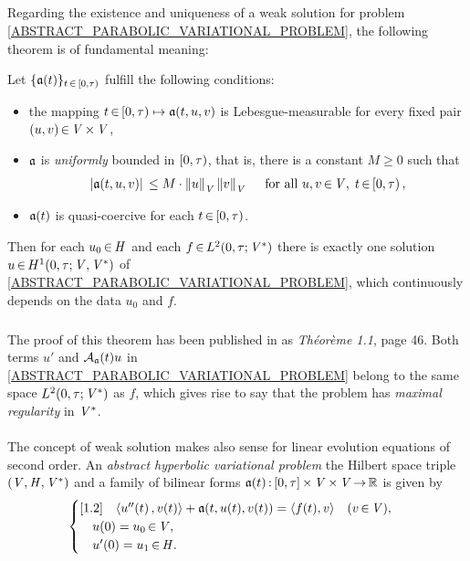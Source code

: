 \documentclass[11pt,twoside]{article}
\begin{document}
\subparagraph{} %
Regarding the existence and uniqueness of a {weak solution}
for problem \eqref{ABSTRACT_PARABOLIC_VARIATIONAL_PROBLEM},
the following theorem is of fundamental meaning:

\begin{theorem1}\label{LIONS_THEOREM_I}
Let $\{\mathfrak{a}(t)\}_{t {\,\in\,} [0,\tau)}$ fulfill the following conditions:

\begin{itemize}[leftmargin=9mm]
\item[(a)]
the mapping $t {\,\in\,} [0,\tau) \mapsto \mathfrak{a}(t,u,v)$ is Lebesgue-measurable
for every fixed pair $(u,v) {\,\in\,} \mathit{V} {\,\times\,} \mathit{V}$,

\item[(b)]
$\mathfrak{a}$ is \textit{uniformly} bounded in $[0,\tau)$,
that is,
there is a constant $M \geq 0$ such that
\[
\abs{\sql(t,u,v)} \, \leq M \cdot \norm{u}_{\vecV} \norm{v}_{\vecV}
\qfa u,v \xeof \vecV, \; t \xeof [0,\T)\,,
\]
\item[(c)]
$\mathfrak{a}(t)$ is quasi-coercive for each $t {\,\in\,} [0,\tau)$.
\end{itemize}

Then for each $u_0 {\,\in\,} \mathit{H}$ and each $f {\,\in\,} L^2(0,\tau;\mathit{V}^*)$
there is exactly one solution $u {\,\in\,} H^1(0,\tau;\mathit{V},\mathit{V}^*)$
of \eqref{ABSTRACT_PARABOLIC_VARIATIONAL_PROBLEM},
which continuously depends on the data $u_0$ and $f$.
\end{theorem1}

\subparagraph{}
The proof of this theorem has been published in \cite{Li2}
as \textit{Th\'{e}or\`{e}me 1.1}, page 46.
Both terms $u'$ and ${{\mathcal{A}}_{\mathfrak{a}}}(t) u$
in \eqref{ABSTRACT_PARABOLIC_VARIATIONAL_PROBLEM}
belong to the same space $L^2(0,\tau;\mathit{V}^*)$ as $f$,
which gives rise to say
that the problem has \textit{maximal regularity} in $\mathit{V}^*$.

\paragraph{} %
The concept of weak solution makes also sense
for linear evolution equations of second order.
An \textit{abstract hyperbolic variational problem}
{\wrt} the Hilbert space triple $(\mathit{V},\mathit{H},\mathit{V}^*)$ 
and a family of bilinear forms
$\mathfrak{a}(t) {\,:\,} [0,\tau] {\,\times\,} \mathit{V} {\,\times\,} \mathit{V} {\,\to\,} {\mathbb{R}}$ is given by
\begin{equation}\label{ABSTRACT_HYPERBOLIC_VARIATIONAL_PROBLEM}
\begin{cases}[1.2]
\quad \langle u''(t)\,,v(t) \rangle + \mathfrak{a}(t,u(t),v(t)) = \langle f(t),v \rangle 
\quad (v {\,\in\,} \mathit{V}), \\
\quad u(0)  = u_0 {\,\in\,} \mathit{V}, \\
\quad u'(0) = u_1 {\,\in\,} \mathit{H}. \\
\end{cases}
\end{equation}
\end{document}
